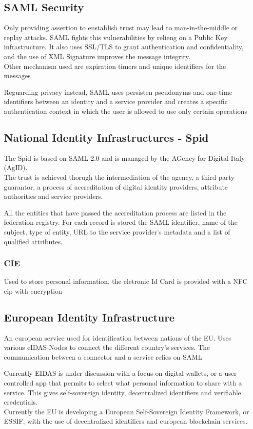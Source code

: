 \documentclass[12pt, a4paper]{article}
\begin{document}
\subsection{SAML Security}
Only providing assertion to enstablish trust may lead to man-in-the-middle or replay attacks. SAML fights this 
vulnerabilities by relieng on a Public Key infrastructure. It also uses SSL/TLS to grant authentication and 
confidentiality, and the use of XML Signature improves the message integrity.\\ Other mechanism used are
expiration timers and unique identifiers for the messages

Reguarding privacy instead, SAML uses persisten pseudonyms and one-time identifiers between an identity and a
service provider and creates a specific authentication context in which the user is allowed to use only certain 
operations

\subsection{National Identity Infrastructures - Spid}
The Spid is based on SAML 2.0 and is managed by the AGency for Digital Italy (AgID).\\The trust is achieved
thorugh the intermediation of the agency, a third party guarantor, a process of accreditation of digital 
identity providers, attribute authorities and service providers. 

All the entities that have passed the accreditation process are listed in the federation registry. For each record
is stored the SAML identifier, name of the subject, type of entity, URL to the service provider's metadata and a 
list of qualified attributes.

\subsubsection{CIE}
Used to store personal information, the eletronic Id Card is provided with a NFC cip with encryption

\subsection{European Identity Infrastructure}
An european service used for identification between nations of the EU. Uses various eIDAS-Nodes to connect the 
different country's services. The communication between a connector and a service relies on SAML

Currently EIDAS is under discussion with a focus on digital wallets, or a user controlled app that permits to 
select what personal information to share with a service. This gives self-sovereign identity, decentralized 
identifiers and verifiable credentials.\\Currently the EU is developing a European Self-Sovereign Identity Framework,
or ESSIF, with the use of decentralized identifiers and european blockchain services.
\end{document}
